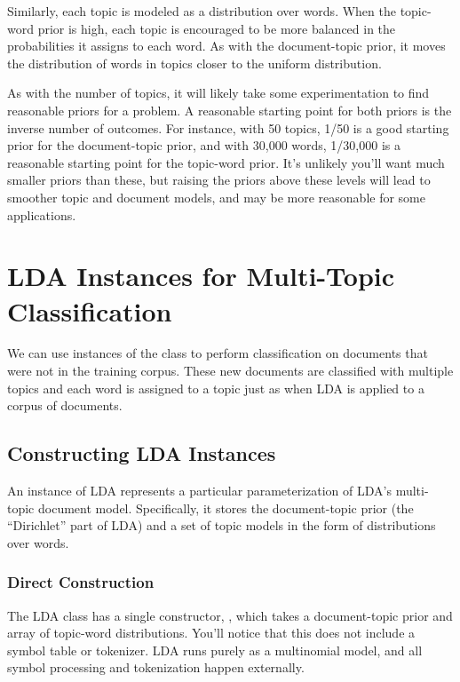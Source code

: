 Similarly, each topic is modeled as a distribution over words.  When
the topic-word prior is high, each topic is encouraged to be more
balanced in the probabilities it assigns to each word.  As with the
document-topic prior, it moves the distribution of words in topics
closer to the uniform distribution.

As with the number of topics, it will likely take some experimentation
to find reasonable priors for a problem.  A reasonable starting point
for both priors is the inverse number of outcomes.  For instance, with
50 topics, 1/50 is a good starting prior for the document-topic prior,
and with 30,000 words, 1/30,000 is a reasonable starting point for the
topic-word prior.  It's unlikely you'll want much smaller priors than
these, but raising the priors above these levels will lead to smoother
topic and document models, and may be more reasonable for some
applications.


\section{LDA Instances for Multi-Topic Classification}

We can use instances of the 
class to perform classification on documents that were not
in the training corpus.   These new documents are classified
with multiple topics and each word is assigned to a topic
just as when LDA is applied to a corpus of documents.  

\subsection{Constructing LDA Instances}

An instance of LDA represents a particular parameterization of
LDA's multi-topic document model.  Specifically, it stores the
document-topic prior (the ``Dirichlet'' part of LDA) and a set
of topic models in the form of distributions over words.

\subsubsection{Direct Construction}

The LDA class has a single constructor,
, which takes a
document-topic prior and array of topic-word distributions.  You'll
notice that this does not include a symbol table or tokenizer.  LDA
runs purely as a multinomial model, and all symbol processing and
tokenization happen externally.

